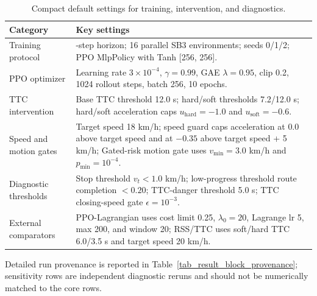 \begin{table}[!htbp]
\centering
\caption{Compact default settings for training, intervention, and diagnostics.}
\label{tab_parameter_defaults}
\footnotesize
\setlength{\tabcolsep}{4.0pt}
\renewcommand{\arraystretch}{1.10}
\begin{tabularx}{\textwidth}{@{}>{\raggedright\arraybackslash}p{}>{\raggedright\arraybackslash}X@{}}
\toprule
Category & Key settings \\
\midrule
Training protocol &
1500-step horizon; 16 parallel SB3 environments; seeds 0/1/2; PPO MlpPolicy with Tanh [256, 256]. \\
PPO optimizer &
Learning rate $3\times10^{-4}$, $\gamma=0.99$, GAE $\lambda=0.95$, clip 0.2, 1024 rollout steps, batch 256, 10 epochs. \\
TTC intervention &
Base TTC threshold 12.0 s; hard/soft thresholds 7.2/12.0 s; hard/soft acceleration caps $u_{\mathrm{hard}}=-1.0$ and $u_{\mathrm{soft}}=-0.6$. \\
Speed and motion gates &
Target speed 18 km/h; speed guard caps acceleration at $0.0$ above target speed and at $-0.35$ above target speed + 5 km/h; Gated-risk motion gate uses $v_{\min}=3.0$ km/h and $p_{\min}=10^{-4}$. \\
Diagnostic thresholds &
Stop threshold $v_t<1.0$ km/h; low-progress threshold route completion $<0.20$; TTC-danger threshold 5.0 s; TTC closing-speed gate $\epsilon=10^{-3}$. \\
External comparators &
PPO-Lagrangian uses cost limit 0.25, $\lambda_0=20$, Lagrange lr 5, max 200, and window 20; RSS/TTC uses soft/hard TTC 6.0/3.5 s and target speed 20 km/h. \\
\bottomrule
\end{tabularx}
\begin{tablenotes}
\item Detailed run provenance is reported in Table~\ref{tab_result_block_provenance}; sensitivity rows are independent diagnostic reruns and should not be numerically matched to the core rows.
\end{tablenotes}
\end{table}
